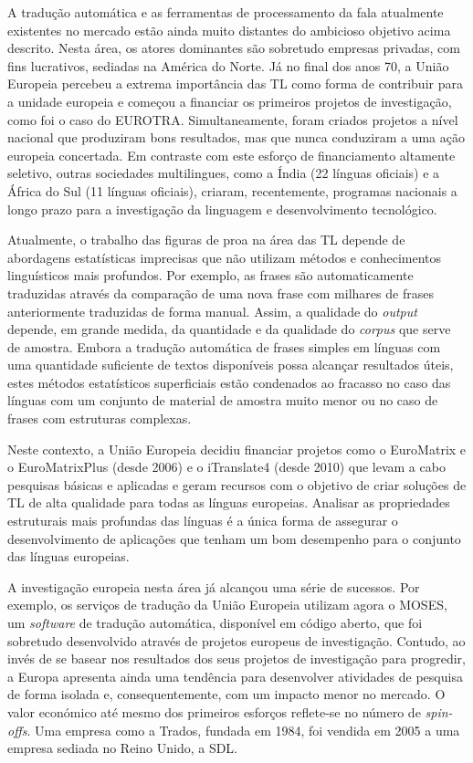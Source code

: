 \documentclass[]{../metanetpaper}
\begin{document}
\begin{multicols}{2}

 A tradução automática e as ferramentas de processamento da fala atualmente existentes no mercado estão ainda muito distantes do ambicioso objetivo acima descrito. Nesta área, os atores dominantes são sobretudo empresas privadas, com fins lucrativos, sediadas na América do Norte. Já no final dos anos 70, a União Europeia percebeu a extrema importância das TL como forma de contribuir para a unidade europeia e começou a financiar os primeiros projetos de investigação, como foi o caso do EUROTRA. Simultaneamente, foram criados projetos a nível nacional que produziram bons resultados, mas que nunca conduziram a uma ação europeia concertada. Em contraste com este esforço de financiamento altamente seletivo, outras sociedades multilingues, como a Índia (22 línguas oficiais) e a África do Sul (11 línguas oficiais), criaram, recentemente, programas nacionais a longo prazo para a investigação da linguagem e desenvolvimento tecnológico.

Atualmente, o trabalho das figuras de proa na área das TL depende de abordagens estatísticas imprecisas que não utilizam métodos e conhecimentos linguísticos mais profundos. Por exemplo, as frases são automaticamente traduzidas através da comparação de uma nova frase com milhares de frases anteriormente traduzidas de forma manual. Assim, a qualidade do \textit{output} depende, em grande medida, da quantidade e da qualidade do \textit{corpus} que serve de amostra. Embora a tradução automática de frases simples em línguas com uma quantidade suficiente de textos disponíveis possa alcançar resultados úteis, estes métodos estatísticos superficiais estão condenados ao fracasso no caso das línguas com um conjunto de material de amostra muito menor ou no caso de frases com estruturas complexas. 

Neste contexto, a União Europeia decidiu financiar projetos como o EuroMatrix e o EuroMatrixPlus (desde 2006) e o iTranslate4 (desde 2010) que levam a cabo pesquisas básicas e aplicadas e geram recursos com o objetivo de criar soluções de TL de alta qualidade para todas as línguas europeias. A\-na\-li\-sar as propriedades estruturais mais profundas das línguas é a única forma de assegurar o desenvolvimento de aplicações que tenham um bom desempenho para o conjunto das línguas europeias.

A investigação europeia nesta área já alcançou uma série de sucessos. Por exemplo, os serviços de tradução da União Europeia utilizam agora o MOSES, um \textit{software} de tradução automática, disponível em código aberto, que foi sobretudo desenvolvido através de projetos europeus de investigação. Contudo, ao invés de se basear nos resultados dos seus projetos de investigação para progredir, a Europa apresenta ainda uma tendência para desenvolver atividades de pesquisa de forma isolada e, consequentemente, com um impacto menor no mercado. O valor económico até mesmo dos primeiros esforços reflete-se no número de \textit{spin-offs}. Uma empresa como a Trados, fundada em 1984, foi vendida em 2005 a uma empresa sediada no Reino Unido, a SDL.


\end{multicols}
\end{document}
